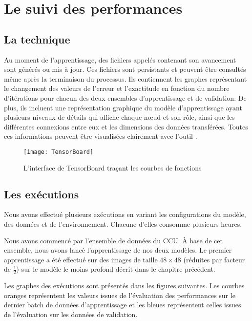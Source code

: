 \section{Le suivi des performances}

\subsection{La technique}

Au moment de l'apprentissage, des fichiers appelés 
contenant son avancement sont générés ou mis à jour. Ces fichiers sont persistants
et peuvent être consultés même après la terminaison du processus. Ils contiennent les graphes
représentant le changement des valeurs de l'erreur et l'exactitude en fonction
du nombre d'itérations pour chacun des deux ensembles d'apprentissage et de
validation. De plus, ils incluent une représentation graphique du modèle
d'apprentissage ayant plusieurs niveaux de détails qui affiche chaque nœud et son
rôle, ainsi que les différentes connexions entre eux et les dimensions des données
transférées. Toutes ces informations peuvent être visualisées clairement avec
l'outil .

\begin{figure}[h]
  \centering
  \texttt{[image: TensorBoard]}
  \caption{L'interface de TensorBoard traçant les courbes de fonctions}
\end{figure}

\subsection{Les exécutions}

Nous avons effectué plusieurs exécutions en variant les configurations du modèle,
des données et de l'environnement. Chacune d'elles consomme plusieurs heures.

Nous avons commencé par l'ensemble de données du CCU. \`A base de cet ensemble,
nous avons lancé l'apprentissage de nos deux modèles. Le premier apprentissage
a été effectué sur des images de taille $48 \times 48$ (réduites par facteur de
$\frac{1}{2}$) sur le modèle le moins profond décrit dans le chapitre précédent.

Les graphes des exécutions sont présentés dans les figures suivantes. Les courbes oranges
représentent les valeurs issues de l'évaluation des performances sur le dernier batch
de données d'apprentissage et les bleues représentent celles issues de l'évaluation
sur les données de validation.

